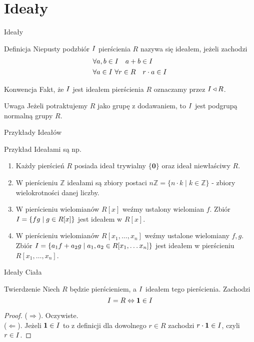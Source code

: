 \documentclass{beamer}
\newcommand{\zero}{\mathbf{0}}
\newcommand{\one}{\mathbf{1}}
\newcommand{\II}{\mathnormal{I}}
\begin{document}
\section{Ideały}
\begin{frame}{Ideały}
    \begin{block}{Definicja}
        Niepusty podzbiór $\II $ pierścienia $R$ nazywa się \alert{ideałem}, jeżeli zachodzi 
        \begin{align}
            & \forall a,b \in \II  \quad a + b \in \II  \\
            & \forall a \in \II \ \forall r \in R \quad r \cdot a \in \II
        \end{align}
    \end{block}
    \pause 
    \begin{alertblock}{Konwencja}
        Fakt, że $\II$ jest ideałem pierścienia $R$ oznaczamy przez $\II \triangleleft R$.
    \end{alertblock}
    \begin{alertblock}{Uwaga}
        Jeżeli potraktujemy $R$ jako grupę z dodawaniem, to $\II$ jest podgrupą normalną grupy $R$.
    \end{alertblock}
\end{frame}

\begin{frame}{Przykłady Ideałów}
    \begin{exampleblock}{Przykład}
        Ideałami są np. 
        \begin{enumerate}
            \item Każdy pierścień $R$ posiada ideał trywialny $\{ \zero \}$ oraz ideał niewłaściwy $R$.
            \item W pierścieniu $\mathbb{Z}$ ideałami są zbiory postaci $n\mathbb{Z} = \{n \cdot k  \mid k \in \mathbb{Z} \}$ - zbiory wielokrotności danej liczby.
            \item W pierścieniu wielomianów $R[x]$ weźmy ustalony wielomian $f$. Zbiór $\II = \{fg \mid g \in R[x]\}$ jest ideałem w $R[x]$.
            \item W pierścieniu wielomianów $R[x_1, \ldots , x_n]$ weźmy ustalone wielomiany $f,g$. Zbiór $\II = \{ a_1f + a_2g \mid a_1,a_2 \in R[x_1, \ldots x_n]\}$ jest ideałem w pierścieniu $R[x_1, \ldots, x_n]$.
        \end{enumerate}
    \end{exampleblock}
\end{frame}

\begin{frame}{Ideały Ciała}
    \begin{block}{Twierdzenie}
        Niech $R$ będzie pierścieniem, a $\II$ ideałem tego pierścienia. Zachodzi 
        $$ \II = R \Leftrightarrow \one \in \II$$
    \end{block}
    \pause 
    \begin{proof}
        ($\Rightarrow$). Oczywiste. \\ 
        ($\Leftarrow$). Jeżeli $\one \in \II$ to z definicji dla dowolnego $r \in R$ zachodzi $r \cdot \one \in \II$, czyli $r \in \II$.
    \end{proof}
    \pause 
\end{frame}
\end{document}
